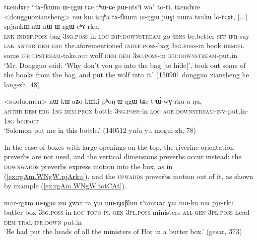 \begin{exe}
\ex \label{ex:tAfkWm.WNgW.chArku}
\gll  tɕendɤre ``tɤ-fkɯm ɯ-ŋgɯ tɕe tʰɯ-ɕe ɲɯ-ntsʰi wo" to-ti. tɕendɤre <dongguoxiansheng> nɯ kɯ iɕqʰa tɤ-fkɯm ɯ-ŋgɯ jɯɣi nɯra tsuku lo-tɕɤt, [...] spjaŋkɯ nɯ nɯ ɯ-ŋgɯ cʰɤ-rku. \\
\textsc{lnk}  \textsc{indef}.\textsc{poss}-bag \textsc{3sg}.\textsc{poss}-in \textsc{loc} \textsc{imp}:\textsc{downstream}-go \textsc{sens}-be.better \textsc{sfp} \textsc{ifr}-say \textsc{lnk}  \textsc{anthr} \textsc{dem} \textsc{erg} the.aforementioned  \textsc{indef}.\textsc{poss}-bag \textsc{3sg}.\textsc{poss}-in book \textsc{dem}:\textsc{pl} some \textsc{ifr}:\textsc{upstream}-take.out { } wolf \textsc{dem} \textsc{dem}  \textsc{3sg}.\textsc{poss}-in \textsc{ifr}:\textsc{downstream}-put.in \\
\glt `Mr. Dongguo said: `Why don't you go into the bag [to hide]', took out some of the books from the bag, and put the wolf into it.' (150901 dongguo xiansheng he lang-zh, 48)
\end{exe}

\begin{exe}
\ex \label{ex:phoN.WNgW.thWwGrkua}
\gll  <suoluomen> nɯ kɯ aʑo kɯki pʰoŋ ɯ-ŋgɯ tɕe tʰɯ́-wɣ-rku-a ŋu,\\
\textsc{anthr} \textsc{dem} \textsc{erg} \textsc{1sg} \textsc{dem}.\textsc{prox} bottle \textsc{3sg}.\textsc{poss}-in \textsc{loc} \textsc{aor}:\textsc{downstream}-\textsc{inv}-put.in-\textsc{1sg} be:\textsc{fact} \\
\glt `Solomon put me in this bottle.' (140512 yufu yu mogui-zh, 78)
\end{exe}

In the case of boxes with large openings on the top, the riverine orientation preverbs are not used, and the vertical dimensions preverbs occur instead: the \textsc{downwards} preverbs express motion into the box, as in (\ref{ex:rgAm.WNgW.pjArku}), and the \textsc{upwards} preverbs motion out of it, as shown by example (\ref{ex:rgAm.WNgW.totCAt}).

\begin{exe}
\ex \label{ex:rgAm.WNgW.pjArku}
\gll mar-rgɤm ɯ-ŋgɯ zɯ χwɤr ra ɣɯ nɯ-rɟɤβlun tʰamtɕɤt ɣɯ nɯ-ku nɯ pjɤ-rku \\
butter-box \textsc{3sg}.\textsc{poss}-in \textsc{loc}  \textsc{topo} \textsc{pl} \textsc{gen} \textsc{3pl}.\textsc{poss}-ministers \textsc{all} \textsc{gen} \textsc{3pl}.\textsc{poss}-head \textsc{dem} \textsc{tral}-\textsc{ifr}:\textsc{down}-put.in \\
\glt `He had put the heads of all the ministers of Hor in a butter box.' (gesar, 373)
\end{exe}

